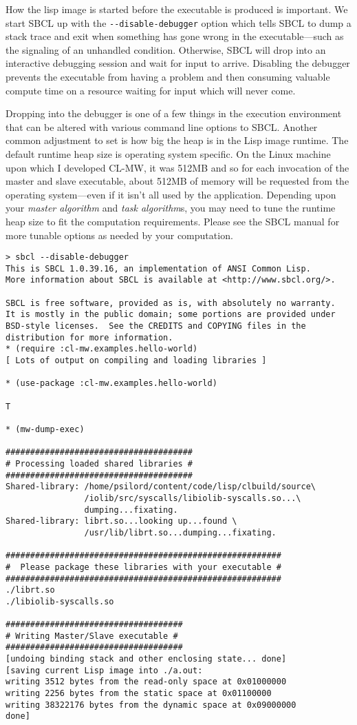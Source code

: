 \documentclass[titlepage,12pt]{book}
\newcommand{\xsmall}{\latexhtml{\small}{}}
\newcommand{\xnormalsize}{\latexhtml{\normalsize}{}}
\newcommand{\sbcl}{SBCL\xspace}
\newcommand{\clmw}{\xsmall\textsc{CL-MW}\xnormalsize\xspace}
\newcommand{\ma}{\textit{master algorithm}\xspace}
\newcommand{\tas}{\textit{task algorithm}s\xspace}
\newcommand{\dash}{\texttt{-}}
\newcommand{\Option}[1]{\dash\dash\texttt{#1}}
\begin{document}
How the lisp image is started before the executable is produced is
important.  We start \sbcl up with the \Option{disable-debugger} option
which tells \sbcl to dump a stack trace and exit when something has
gone wrong in the executable---such as the signaling of an unhandled
condition. Otherwise, \sbcl will drop into an interactive debugging
session and wait for input to arrive. Disabling the debugger prevents
the executable from having a problem and then consuming valuable
compute time on a resource waiting for input which will never come.

Dropping into the debugger is one of a few things in the execution
environment that can be altered with various command line options
to \sbcl. Another common adjustment to set is how big the heap is in
the Lisp image runtime.  The default runtime heap size is operating
system specific. On the Linux machine upon which I developed \clmw,
it was 512MB and so for each invocation of the master and slave
executable, about 512MB of memory will be requested from the operating
system---even if it isn't all used by the application. Depending upon
your \ma and \tas, you may need to tune the runtime heap size to fit
the computation requirements. Please see the \sbcl manual for more
tunable options as needed by your computation.

\small
\begin{verbatim}
> sbcl --disable-debugger
This is SBCL 1.0.39.16, an implementation of ANSI Common Lisp.
More information about SBCL is available at <http://www.sbcl.org/>.

SBCL is free software, provided as is, with absolutely no warranty.
It is mostly in the public domain; some portions are provided under
BSD-style licenses.  See the CREDITS and COPYING files in the
distribution for more information.
* (require :cl-mw.examples.hello-world)
[ Lots of output on compiling and loading libraries ]

* (use-package :cl-mw.examples.hello-world)

T

* (mw-dump-exec)

######################################
# Processing loaded shared libraries #
######################################
Shared-library: /home/psilord/content/code/lisp/clbuild/source\
                /iolib/src/syscalls/libiolib-syscalls.so...\
                dumping...fixating.
Shared-library: librt.so...looking up...found \
                /usr/lib/librt.so...dumping...fixating.

########################################################
#  Please package these libraries with your executable #
########################################################
./librt.so
./libiolib-syscalls.so

####################################
# Writing Master/Slave executable #
####################################
[undoing binding stack and other enclosing state... done]
[saving current Lisp image into ./a.out:
writing 3512 bytes from the read-only space at 0x01000000
writing 2256 bytes from the static space at 0x01100000
writing 38322176 bytes from the dynamic space at 0x09000000
done]
\end{verbatim}
\normalsize
\end{document}
